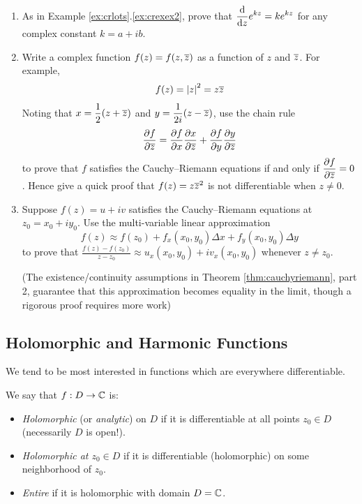 \begin{exercises}{}
\begin{enumerate}
	  
	  \item As in Example \ref*{ex:crlots}.\ref{ex:crexex2}, prove that $\displaystyle \diff ze^{kz} =ke^{kz}$ for any complex constant $k=a+ib$.
	  
	  
	  \item Write a complex function $f(z)=f(z,\cl z)$ as a function of $z$ and $\cl z$. For example,
	  \[
	  	f(z)=\nm z^2=z\cl z
	  \]
	  Noting that $\displaystyle x=\frac 12(z+\cl z)$ and $\displaystyle y=\frac 1{2i}(z-\cl z)$, use the chain rule
	  \[
			\partials[f]{\cl z}=\partials[f]{x}\partials[x]{\cl z}+\partials[f]{y}\partials[y]{\cl z}
		\]
	  to prove that $f$ satisfies the Cauchy--Riemann equations if and only if $\displaystyle \partials[f]{\cl z}=0$.\smallbreak
	  Hence give a quick proof that $f(z)=z\cl z^2$ is not differentiable when $z\neq 0$.
	  
	  
	  \item\label{exs:crconv} Suppose $f(z)=u+iv$ satisfies the Cauchy--Riemann equations at $z_0=x_0+iy_0$. Use the multi-variable linear approximation
	  \[
	  	f(z)\approx f(z_0)+f_x(x_0,y_0)\Delta x+f_y(x_0,y_0)\Delta y
	  \]
	  to prove that $\frac{f(z)-f(z_0)}{z-z_0}\approx u_x(x_0,y_0)+iv_x(x_0,y_0)$ whenever $z\neq z_0$.\par
		(The existence/continuity assumptions in Theorem \ref{thm:cauchyriemann}, part 2, guarantee that this approximation becomes equality in the limit, though a rigorous proof requires more work)
	\end{enumerate}
\end{exercises}

\clearpage



\subsection[Holomorphic Functions]{Holomorphic and Harmonic Functions}\label{subsec:analytic}%

We tend to be most interested in functions which are everywhere differentiable.

\begin{defn}{}{}
	We say that $f:D\to\C$ is:
	\begin{itemize}
	  \item \emph{Holomorphic} (or \emph{analytic}\footnotemark) on $D$ if it is differentiable at all points $z_0\in D$ (necessarily $D$ is open!).
	  \item \emph{Holomorphic at $z_0\in D$} if it is differentiable (holomorphic) on some neighborhood of $z_0$.
	  \item \emph{Entire} if it is holomorphic with domain $D=\C$.
	\end{itemize}
\end{defn}

